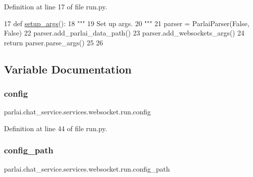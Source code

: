 Definition at line 17 of file run.\+py.


\begin{DoxyCode}
17 \textcolor{keyword}{def }\hyperlink{namespaceparlai_1_1tasks_1_1talkthewalk_1_1run_a3534e8afa0a4dc25a6e02740fa35ac84}{setup\_args}():
18     \textcolor{stringliteral}{"""}
19 \textcolor{stringliteral}{    Set up args.}
20 \textcolor{stringliteral}{    """}
21     parser = ParlaiParser(\textcolor{keyword}{False}, \textcolor{keyword}{False})
22     parser.add\_parlai\_data\_path()
23     parser.add\_websockets\_args()
24     \textcolor{keywordflow}{return} parser.parse\_args()
25 
26 
\end{DoxyCode}


\subsection{Variable Documentation}
\mbox{\label{namespaceparlai_1_1chat__service_1_1services_1_1websocket_1_1run_ac583a14d08de85e9c7be6267d13b1a91}} 
\subsubsection{\texorpdfstring{config}{config}}
{\footnotesize\ttfamily parlai.\+chat\+\_\+service.\+services.\+websocket.\+run.\+config}



Definition at line 44 of file run.\+py.

\mbox{\label{namespaceparlai_1_1chat__service_1_1services_1_1websocket_1_1run_aaee8669d70752161a2cf0945d6b9f161}} 
\subsubsection{\texorpdfstring{config\+\_\+path}{config\_path}}
{\footnotesize\ttfamily parlai.\+chat\+\_\+service.\+services.\+websocket.\+run.\+config\+\_\+path}



